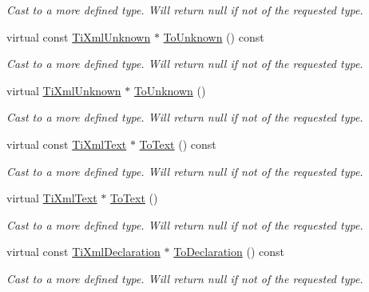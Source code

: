 \begin{DoxyCompactItemize}
\begin{DoxyCompactList}\small\item\em Cast to a more defined type. Will return null if not of the requested type. \item\end{DoxyCompactList}\item 
virtual const \hyperlink{classTiXmlUnknown}{TiXmlUnknown} $\ast$ \hyperlink{classTiXmlNode_afd7205cf31d7a376929f8a36930627a2}{ToUnknown} () const 
\begin{DoxyCompactList}\small\item\em Cast to a more defined type. Will return null if not of the requested type. \item\end{DoxyCompactList}\item 
virtual \hyperlink{classTiXmlUnknown}{TiXmlUnknown} $\ast$ \hyperlink{classTiXmlNode_a06de5af852668c7e4af0d09c205f0b0d}{ToUnknown} ()
\begin{DoxyCompactList}\small\item\em Cast to a more defined type. Will return null if not of the requested type. \item\end{DoxyCompactList}\item 
virtual const \hyperlink{classTiXmlText}{TiXmlText} $\ast$ \hyperlink{classTiXmlNode_a95a46a52c525992d6b4ee08beb14cd69}{ToText} () const 
\begin{DoxyCompactList}\small\item\em Cast to a more defined type. Will return null if not of the requested type. \item\end{DoxyCompactList}\item 
virtual \hyperlink{classTiXmlText}{TiXmlText} $\ast$ \hyperlink{classTiXmlNode_a3ddfbcac78fbea041fad57e5c6d60a03}{ToText} ()
\begin{DoxyCompactList}\small\item\em Cast to a more defined type. Will return null if not of the requested type. \item\end{DoxyCompactList}\item 
virtual const \hyperlink{classTiXmlDeclaration}{TiXmlDeclaration} $\ast$ \hyperlink{classTiXmlNode_a9f43e6984fc7d4afd6eb32714c6b7b72}{ToDeclaration} () const 
\begin{DoxyCompactList}\small\item\em Cast to a more defined type. Will return null if not of the requested type. \item\end{DoxyCompactList}\item 

\end{DoxyCompactItemize}
